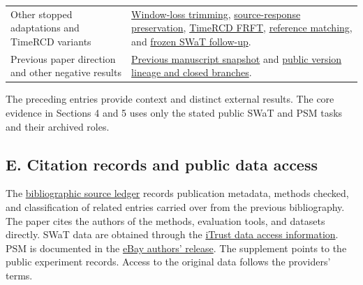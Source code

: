 \documentclass[
  american,
]{article}
\begin{document}
\begin{longtable}[]{@{}
  >{\raggedright\arraybackslash}p{}
  >{\raggedright\arraybackslash}p{}@{}}
Other stopped adaptations and TimeRCD variants &
\href{../../docs/experiments/left_selective_swat_20261118/RESULTS.md}{Window-loss
trimming},
\href{../../docs/experiments/left_source_preservation_20261118/RESULTS.md}{source-response
preservation},
\href{../../docs/experiments/timercd_source_frft_20261117/RESULTS.md}{TimeRCD
FRFT},
\href{../../docs/experiments/timercd_reference_repeats_20261117/RESULTS.md}{reference
matching}, and
\href{../../docs/experiments/timercd_reference_swat_20261118/RESULTS.md}{frozen
SWaT follow-up}. \\
Previous paper direction and other negative results &
\href{https://github.com/codexpker/Hybrid/blob/733667a627cf8da16a1546853c6def7b66917b92/manuscript/next_generation_20261115/draft.md}{Previous
manuscript snapshot} and \href{../../docs/research_scope.md}{public
version lineage and closed branches}. \\
\end{longtable}

The preceding entries provide context and distinct external results. The
core evidence in Sections 4 and 5 uses only the stated public SWaT and
PSM tasks and their archived roles.

\subsection{E. Citation records and public data
access}\label{e.-citation-records-and-public-data-access}

The \href{citation_sources.md}{bibliographic source ledger} records
publication metadata, methods checked, and classification of related
entries carried over from the previous bibliography. The paper cites the
authors of the methods, evaluation tools, and datasets directly. SWaT
data are obtained through the
\href{https://www.sutd.edu.sg/itrust/itrust-labs/datasets/dataset-characteristics/swat/}{iTrust
data access information}. PSM is documented in the
\href{https://github.com/eBay/RANSynCoders}{eBay authors' release}. The
supplement points to the public experiment records. Access to the
original data follows the providers' terms.
\end{document}
